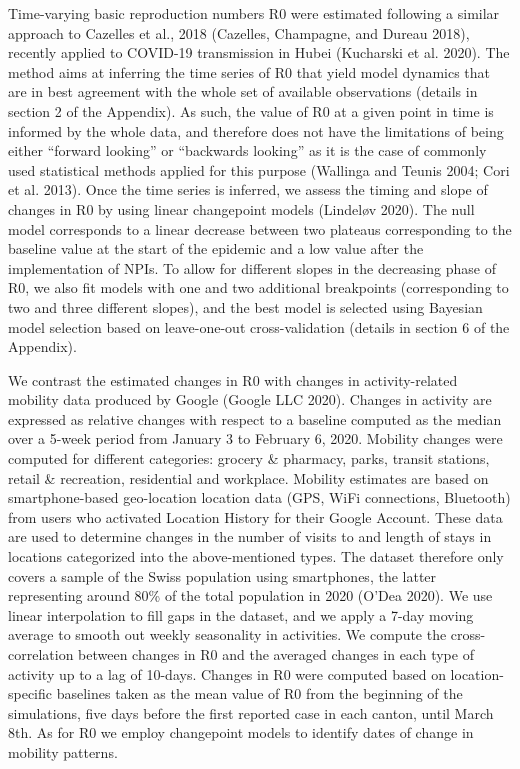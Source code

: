 Time-varying basic reproduction numbers R0 were estimated following a similar approach to Cazelles et al., 2018 (Cazelles, Champagne, and Dureau 2018), recently applied to COVID-19 transmission in Hubei (Kucharski et al. 2020). The method aims at inferring the time series of R0 that yield model dynamics that are in best agreement with the whole set of available observations (details in section 2 of the Appendix). As such, the value of R0 at a given point in time is informed by the whole data, and therefore does not have the limitations of being either “forward looking” or “backwards looking” as it is the case of commonly used statistical methods applied for this purpose (Wallinga and Teunis 2004; Cori et al. 2013). Once the time series is inferred, we assess the timing and slope of changes in R0 by using linear changepoint models (Lindeløv 2020). The null model corresponds to a linear decrease between two plateaus corresponding to the baseline value at the start of the epidemic and a low value after the implementation of NPIs. To allow for different slopes in the decreasing phase of R0, we also fit models with one and two additional breakpoints (corresponding to two and three different slopes), and the best model is selected using Bayesian model selection based on leave-one-out cross-validation (details in section 6 of the Appendix).  

We contrast the estimated changes in R0 with changes in activity-related mobility data produced by Google (Google LLC 2020). Changes in activity are expressed as relative changes with respect to a baseline computed as the median over a 5-week period from January 3 to February 6, 2020.  Mobility changes were computed for different categories: grocery \& pharmacy, parks, transit stations, retail \& recreation, residential and workplace. Mobility estimates are based on smartphone-based geo-location location data (GPS, WiFi connections, Bluetooth) from users who activated Location History for their Google Account. These data are used to determine changes in the  number of visits to and length of stays in locations categorized into the above-mentioned types. The dataset therefore only covers a sample of the Swiss population using smartphones, the latter representing around 80\% of the total population in 2020 (O’Dea 2020).  We use linear interpolation to fill gaps in the dataset, and we apply a 7-day moving average to smooth out weekly seasonality in activities. We compute the cross-correlation between changes in R0 and the averaged changes in each type of activity up to a lag of 10-days. Changes in R0 were computed based on location-specific baselines taken as the mean value of R0 from the beginning of the simulations, five days before the first reported case in each canton, until March 8th. As for R0 we employ changepoint models to identify dates of change in mobility patterns.

